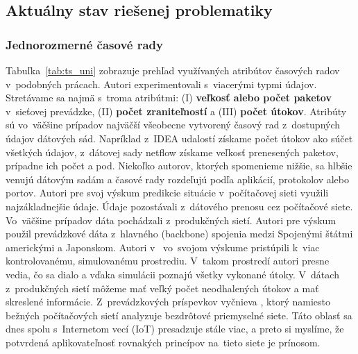 \documentclass[thesismargins, thesislinespacing, openright, upjsfrontpage]{rnthesis}
\begin{document}
\subsection{Aktuálny stav riešenej problematiky}

\subsubsection{Jednorozmerné časové rady}

Tabuľka~\ref{tab:ts_uni} zobrazuje prehľad využívaných atribútov časových radov v~podobných prácach. Autori experimentovali s~viacerými typmi údajov. Stretávame sa najmä s~troma atribútmi: (I) \textbf{veľkosť alebo počet paketov} v~sieťovej prevádzke, (II) \textbf{počet zraniteľností} a (III) \textbf{počet útokov}. Atribúty sú vo~väčšine prípadov najväčší všeobecne vytvorený časový rad z~dostupných údajov dátových sád. Napríklad z~IDEA udalostí získame počet útokov ako súčet všetkých údajov, z~dátovej sady net\-flow získame veľkosť prenesených paketov, prípadne ich počet a pod. Niekoľko autorov, ktorých spomenieme nižšie, sa hlbšie venujú dátovým sadám a časové rady rozdeľujú podľa aplikácií, protokolov alebo portov. 
Autori \cite{jiang2004detecting, wei2012intrusion,madan2018predicting, sang2002predictability,wang2008internet,hasegawa2001applications} pre svoj výskum predikcie situácie v~počítačovej sieti využili najzákladnejšie údaje. Údaje pozostávali z~dátového prenosu cez počítačové siete. Vo~väčšine prípadov dáta pochádzali z~produkčných sietí. Autori \cite{hasegawa2001applications} pre výskum použil prevádzkové dáta z~hlavného (backbone) spojenia medzi Spojenými štátmi americkými a Japonskom. Autori v~\cite{jiang2004detecting} vo~svojom výskume pristúpili k~viac kontrolovanému, simulovanému prostrediu. V~takom prostredí autori presne vedia, čo sa dialo a vďaka simulácii poznajú všetky vykonané útoky. V~dátach z~produkčných sietí môžeme mať veľký počet neodhalených útokov a mať skreslené informácie. Z~prevádzkových príspevkov vyčnieva \cite{wei2012intrusion}, ktorý namiesto bežných počítačových sietí analyzuje bezdrôtové priemyselné siete. Táto oblasť sa dnes spolu s~Internetom vecí (IoT) presadzuje stále viac, a preto si myslíme, že potvrdená aplikovateľnosť rovnakých princípov na~tieto siete je prínosom.
\end{document}
